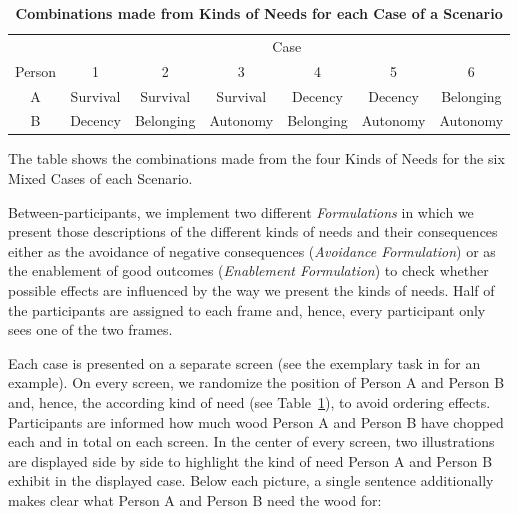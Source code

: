 \documentclass[10pt,letterpaper]{article}
\begin{document}
\begin{table}[ht!]
\begin{adjustwidth}{0in}{0in}
\caption{\bf Combinations made from Kinds of Needs for each Case of a Scenario}
\label{tab:combinations}
\begin{tabular}{ccccccc}\hline
               & \multicolumn{6}{c}{Case}                                                       \\\cline{2-7}
      Person   & 1          & 2           & 3          & 4           & 5          & 6           \\\hline\hline
      A        & Survival   & Survival    & Survival   & Decency     & Decency    & Belonging   \\
      B        & Decency    & Belonging   & Autonomy   & Belonging   & Autonomy   & Autonomy    \\\hline
\end{tabular}
\begin{flushleft}
   The table shows the combinations made from the four Kinds of Needs for the six Mixed Cases of each Scenario.
\end{flushleft}
\end{adjustwidth}
\end{table}

Between-participants, we implement two different \textit{Formulations} in which we present those descriptions of the different kinds of needs and their consequences either as the avoidance of negative consequences (\textit{Avoidance Formulation}) or as the enablement of good outcomes (\textit{Enablement Formulation}) to check whether possible effects are influenced by the way we present the kinds of needs.
Half of the participants are assigned to each frame and, hence, every participant only sees one of the two frames.

Each case is presented on a separate screen (see the exemplary task in  for an example).
On every screen, we randomize the position of Person A and Person B and, hence, the according kind of need (see Table~\ref{tab:combinations}), to avoid ordering effects.
Participants are informed how much wood Person A and Person B have chopped each and in total on each screen.
In the center of every screen, two illustrations are displayed side by side to highlight the kind of need Person A and Person B exhibit in the displayed case.
Below each picture, a single sentence additionally makes clear what Person A and Person B need the wood for:
\end{document}
